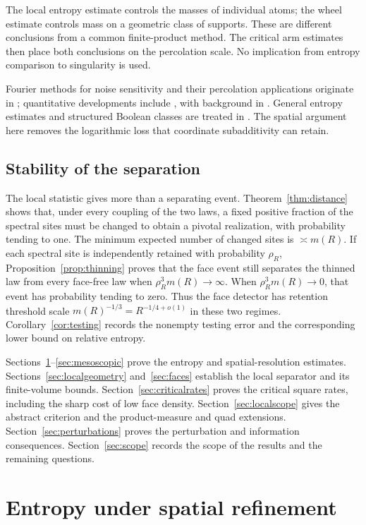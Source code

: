 \documentclass[11pt]{amsart}
\theoremstyle{remark}
\begin{document}
The local entropy estimate controls the masses of individual atoms; the wheel estimate controls mass on a geometric class of supports. These are different conclusions from a common finite-product method. The critical arm estimates then place both conclusions on the percolation scale. No implication from entropy comparison to singularity is used.

Fourier methods for noise sensitivity and their percolation applications originate in \cite{BKS}; quantitative developments include \cite{SS,GPS,TV}, with background in \cite{GS}. General entropy estimates and structured Boolean classes are treated in \cite{KMS,KKLMS,Han,OWZ,OT,CKLS,WWW,GMP}. The spatial argument here removes the logarithmic loss that coordinate subadditivity can retain.

\subsection{Stability of the separation}

The local statistic gives more than a separating event. Theorem~\ref{thm:distance} shows that, under every coupling of the two laws, a fixed positive fraction of the spectral sites must be changed to obtain a pivotal realization, with probability tending to one. The minimum expected number of changed sites is $\asymp m(R)$. If each spectral site is independently retained with probability $\rho_R$, Proposition~\ref{prop:thinning} proves that the face event still separates the thinned law from every face-free law when $\rho_R^3m(R)\to\infty$. When $\rho_R^3m(R)\to0$, that event has probability tending to zero. Thus the face detector has retention threshold scale $m(R)^{-1/3}=R^{-1/4+o(1)}$ in these two regimes. Corollary~\ref{cor:testing} records the nonempty testing error and the corresponding lower bound on relative entropy.

Sections~\ref{sec:forest}--\ref{sec:mesoscopic} prove the entropy and spatial-resolution estimates. Sections~\ref{sec:localgeometry} and~\ref{sec:faces} establish the local separator and its finite-volume bounds. Section~\ref{sec:criticalrates} proves the critical square rates, including the sharp cost of low face density. Section~\ref{sec:localscope} gives the abstract criterion and the product-measure and quad extensions. Section~\ref{sec:perturbations} proves the perturbation and information consequences. Section~\ref{sec:scope} records the scope of the results and the remaining questions.

\section{Entropy under spatial refinement}\label{sec:forest}
\end{document}
